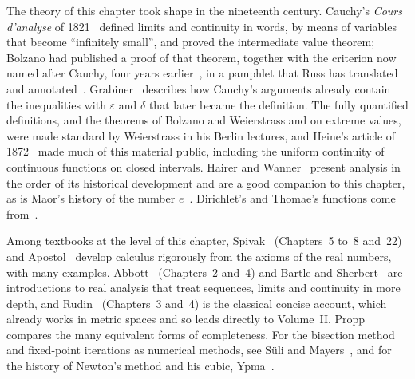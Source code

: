 \chapternotes

The theory of this chapter took shape in the nineteenth century. Cauchy's \emph{Cours d'analyse} of 1821~\cite{cauchy1821} defined limits and continuity in words, by means of variables that become ``infinitely small'', and proved the intermediate value theorem; Bolzano had published a proof of that theorem, together with the criterion now named after Cauchy, four years earlier~\cite{bolzano1817}, in a pamphlet that Russ has translated and annotated~\cite{russ1980}. Grabiner~\cite{grabiner1981} describes how Cauchy's arguments already contain the inequalities with $\varepsilon$ and $\delta$ that later became the definition. The fully quantified definitions, and the theorems of Bolzano and Weierstrass and on extreme values, were made standard by Weierstrass in his Berlin lectures, and Heine's article of 1872~\cite{heine1872} made much of this material public, including the uniform continuity of continuous functions on closed intervals. Hairer and Wanner~\cite{hairer1996analysis} present analysis in the order of its historical development and are a good companion to this chapter, as is Maor's history of the number $e$~\cite{maor1994}. Dirichlet's and Thomae's functions come from~\cite{dirichlet1829,thomae1875}.

Among textbooks at the level of this chapter, Spivak~\cite{spivak2008calculus} (Chapters~5 to~8 and~22) and Apostol~\cite{apostol1967calculus} develop calculus rigorously from the axioms of the real numbers, with many examples. Abbott~\cite{abbott2015} (Chapters~2 and~4) and Bartle and Sherbert~\cite{bartle2011} are introductions to real analysis that treat sequences, limits and continuity in more depth, and Rudin~\cite{rudin1976} (Chapters~3 and~4) is the classical concise account, which already works in metric spaces and so leads directly to Volume~II. Propp~\cite{propp2013} compares the many equivalent forms of completeness. For the bisection method and fixed-point iterations as numerical methods, see S\"uli and Mayers~\cite{suli2003}, and for the history of Newton's method and his cubic, Ypma~\cite{ypma1995}.

\chapterreferences
